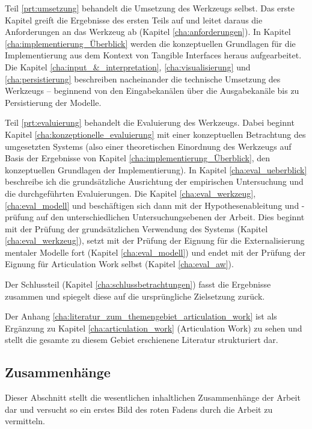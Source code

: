 Teil \ref{prt:umsetzung} behandelt die Umsetzung des Werkzeugs selbst. Das erste Kapitel greift die Ergebnisse des ersten Teils auf und leitet daraus die Anforderungen an das Werkzeug ab (Kapitel \ref{cha:anforderungen}). In Kapitel \ref{cha:implementierung_Überblick} werden die konzeptuellen Grundlagen für die Implementierung aus dem Kontext von Tangible Interfaces heraus aufgearbeitet. Die Kapitel \ref{cha:input_&_interpretation}, \ref{cha:visualisierung} und \ref{cha:persistierung} beschreiben nacheinander die technische Umsetzung des Werkzeugs -- beginnend von den Eingabekanälen über die Ausgabekanäle bis zu Persistierung der Modelle. 

Teil \ref{prt:evaluierung} behandelt die Evaluierung des Werkzeugs. Dabei beginnt Kapitel \ref{cha:konzeptionelle_evaluierung} mit einer konzeptuellen Betrachtung des umgesetzten Systems (also einer theoretischen Einordnung des Werkzeugs auf Basis der Ergebnisse von Kapitel \ref{cha:implementierung_Überblick}, den konzeptuellen Grundlagen der Implementierung). In Kapitel \ref{cha:eval_ueberblick} beschreibe ich die grundsätzliche Ausrichtung der empirischen Untersuchung und die durchgeführten Evaluierungen. Die Kapitel \ref{cha:eval_werkzeug}, \ref{cha:eval_modell} und beschäftigen sich dann mit der Hypothesenableitung und -prüfung auf den unterschiedlichen Untersuchungsebenen der Arbeit. Dies beginnt mit der Prüfung der grundsätzlichen Verwendung des Systems (Kapitel \ref{cha:eval_werkzeug}), setzt mit der Prüfung der Eignung für die Externalisierung mentaler Modelle fort (Kapitel \ref{cha:eval_modell}) und endet mit der Prüfung der Eignung für Articulation Work selbst (Kapitel \ref{cha:eval_aw}).

Der Schlussteil (Kapitel \ref{cha:schlussbetrachtungen}) fasst die Ergebnisse zusammen und spiegelt diese auf die ursprüngliche Zielsetzung zurück.

Der Anhang \ref{cha:literatur_zum_themengebiet_articulation_work} ist als Ergänzung zu Kapitel \ref{cha:articulation_work} (Articulation Work) zu sehen und stellt die gesamte zu diesem Gebiet erschienene Literatur strukturiert dar.

\subsection{Zusammenhänge} %
\label{sub:zusammenhänge}

Dieser Abschnitt stellt die wesentlichen inhaltlichen Zusammenhänge der Arbeit dar und versucht so ein erstes Bild des roten Fadens durch die Arbeit zu vermitteln.

